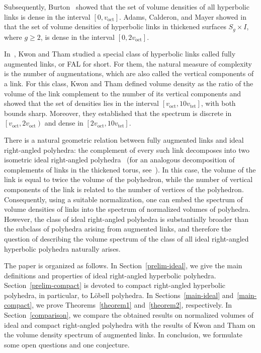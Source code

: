 \documentclass{amsart}
\newcommand{\voct}{v_{\mathrm{oct}}}
\newcommand{\vtet}{v_{\mathrm{tet}}}
\begin{document}
Subsequently, Burton~\cite{Bur2016} showed that the set of volume densities of all hyperbolic links is dense in the interval $\left[ 0, \voct \right]$. Adams, Calderon, and Mayer showed in~\cite{ACM} that the set of volume densities of hyperbolic links in thickened surfaces $S_g \times I$, where $g \geq 2$, is dense in the interval $\left[0, 2\voct \right]$.

In~\cite{KwonTham}, Kwon and Tham studied a special class of hyperbolic links called fully augmented links, or FAL for short. For them, the natural measure of complexity is the number of augmentations, which are also called the vertical components of a link. For this class, Kwon and Tham defined volume density as the ratio of the volume of the link complement to the number of its vertical components and showed that the set of densities lies in the interval $\left[ \voct,10\vtet \right]$, with both bounds sharp. Moreover, they established that the spectrum is discrete in $\left[ \voct, 2\voct \right)$ and dense in $\left[ 2\voct, 10\vtet \right]$.
	
There is a natural geometric relation between fully augmented links and ideal right-angled polyhedra: the complement of every such link decomposes into two isometric ideal right-angled polyhedra~\cite{La04,Pur2011,VeEg24} (for an analogous decomposition of complements of links in the thickened torus, see~\cite{Kw}). In this case, the volume of the link is equal to twice the volume of the polyhedron, while the number of vertical components of the link is related to the number of vertices of the polyhedron. Consequently, using a suitable normalization, one can embed the spectrum of volume densities of links into the spectrum of normalized volumes of polyhedra. However, the class of ideal right-angled polyhedra is substantially broader than the subclass of polyhedra arising from augmented links, and therefore the question of describing the volume spectrum of the class of all ideal right-angled hyperbolic polyhedra naturally arises.
	
The paper is organized as follows.
In Section~\ref{prelim-ideal}, we give the main definitions and properties of ideal right-angled hyperbolic polyhedra. Section~\ref{prelim-compact} is devoted to compact right-angled hyperbolic polyhedra, in particular, to L\"obell polyhedra. In Sections~\ref{main-ideal} and~\ref{main-compact}, we prove Theorems~\ref{theorem1} and~\ref{theorem2}, respectively. In Section~\ref{comparison}, we compare the obtained results on normalized volumes of ideal and compact right-angled polyhedra with the results of Kwon and Tham on the volume density spectrum of augmented links. In conclusion, we formulate some open questions and one conjecture.
	
\end{document}
